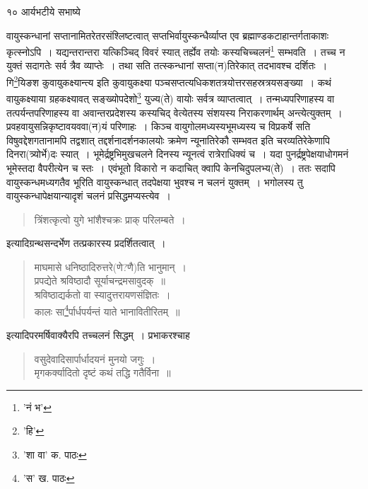 \documentclass[11pt, openany]{book}
\begin{document}
\newpage

\vspace{3cm} १०\hspace{4cm} आर्यभटीये सभाष्ये

\vspace{0.3cm}
\noindent वायुस्कन्धानां सप्तानामितरेतरसंश्लिष्टत्वात् सप्तभिर्वायुस्कन्धैर्व्याप्त एव ब्रह्माण्डकटाहान्तर्गताकाशः कृत्स्नोऽपि~। यद्यन्तरान्तरा यत्किञ्चिद् विवरं स्यात् तर्ह्येव तयोः कस्यचिच्चलनं\renewcommand{\thefootnote}{१}\footnote{'नं भ'} सम्भवति~। तच्च न युक्तं सदागतेः सर्व त्रैव व्याप्तेः~। तथा सति तत्स्कन्धानां सप्ता(न)तिरेकात् तदभावश्च
दर्शितः~। {\qt गि\renewcommand{\thefootnote}{२}\footnote{'हि'}यिङश कुवायुकक्ष्यान्त्य} इति कुवायुकक्ष्या
पञ्चसप्तत्यधिकशतत्रयोत्तरसहस्रत्रयसङ्ख्या~। कथं वायुकक्ष्याया ग्रहकक्ष्यावत् सङ्ख्योपदेशो\renewcommand{\thefootnote}{३}\footnote{'शा वा' क. पाठः} युज्य(ते) वायोः सर्वत्र व्याप्तत्वात्~। तन्मध्यपरिणाहस्य वा तत्पर्यन्तपरिणाहस्य वा अवान्तरप्रदेशस्य कस्यचिद् वेत्येतस्य संशयस्य निराकरणार्थम् अन्त्येत्युक्तम्~। प्रवहवायुसन्निकृष्टावयववा(न)यं परिणाहः~। किञ्च वायुगोलमध्यस्यभूमध्यस्य च विप्रकर्षे सति विषुवद्देशगतानामपि तद्वशात् तद्दर्शनादर्शनकालयोः क्रमेण न्यूनातिरेकौ सम्भवत इति चरव्यतिरेकेणापि दिनरा(त्र्योर्भे)दः स्यात्~। भूमेर्द्रष्ट्रभिमुखचलने दिनस्य न्यूनत्वं रात्रेराधिक्यं च~। यदा पुनर्द्रष्ट्रपेक्षयाधोगमनं भूमेस्तदा वैपरीत्येन च स्तः~। एवंभूतो विकारो न कदाचित् क्वापि केनचिदुपलभ्य(ते)~। ततः सदापि वायुस्कन्धमध्यगतैव भूरिति वायुस्कन्धात् तदपेक्षया भुवश्च न चलनं युक्तम्~। भगोलस्य तु वायुस्कन्धापेक्षयान्यादृशं चलनं प्रसिद्धमप्यस्त्येव~। 

\begin{quote}
{\qt त्रिंशत्कृत्वो युगे भांशैश्चक्रः प्राक् परिलम्बते~।}
\end{quote}

\noindent इत्यादिग्रन्थसन्दर्भेण तत्प्रकारस्य प्रदर्शितत्वात्~। 

\begin{quote} 
{\qt माघमासे धनिष्ठादिरुत्तरे(णे?णै)ति भानुमान्~।\\
प्रपद्येते श्रविष्ठादौ सूर्याचन्द्रमसावुदक्~॥\\
श्रविष्ठाद्यर्कतो वा स्यादुत्तरायणसंज्ञितः~।\\
कालः सा\renewcommand{\thefootnote}{४}\footnote{'स' ख. पाठः}र्पार्धपर्यन्तं याते भानावितीरितम्~॥}
\end{quote}

\noindent इत्यादिपरमर्षिवाक्यैरपि तच्चलनं सिद्धम्~। प्रभाकरश्चाह\textendash 

\begin{quote}
{\qt वसुदेवादिसार्पार्धादयनं मुनयो जगुः~।\\
मृगकर्क्यादितो दृष्टं कथं तद्धि गतैर्विना~॥}
\end{quote}
\end{document}
